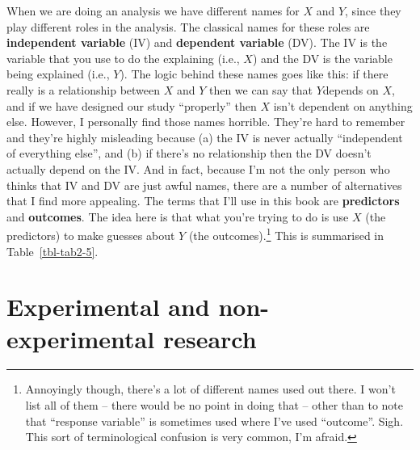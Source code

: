 \documentclass[
  a4paper,
]{book}
\begin{document}
When we are doing an analysis we have different names for \(X\) and
\(Y\), since they play different roles in the analysis. The classical
names for these roles are \textbf{independent variable} (IV) and
\textbf{dependent variable} (DV). The IV is the variable that you use to
do the explaining (i.e., \(X\)) and the DV is the variable being
explained (i.e., \(Y\)). The logic behind these names goes like this: if
there really is a relationship between \(X\) and \(Y\) then we can say
that \(Y\)depends on \(X\), and if we have designed our study
``properly'' then \(X\) isn't dependent on anything else. However, I
personally find those names horrible. They're hard to remember and
they're highly misleading because (a) the IV is never actually
``independent of everything else'', and (b) if there's no relationship
then the DV doesn't actually depend on the IV. And in fact, because I'm
not the only person who thinks that IV and DV are just awful names,
there are a number of alternatives that I find more appealing. The terms
that I'll use in this book are \textbf{predictors} and
\textbf{outcomes}. The idea here is that what you're trying to do is use
\(X\) (the predictors) to make guesses about \(Y\) (the
outcomes).\footnote{Annoyingly though, there's a lot of different names
  used out there. I won't list all of them -- there would be no point in
  doing that -- other than to note that ``response variable'' is
  sometimes used where I've used ``outcome''. Sigh. This sort of
  terminological confusion is very common, I'm afraid.} This is
summarised in Table~\ref{tbl-tab2-5}.

\begin{table}

\caption{\label{tbl-tab2-5}Variable distinctions}

\centering
{}

\end{table}%

\section{Experimental and non-experimental
research}\label{experimental-and-non-experimental-research}
\end{document}
